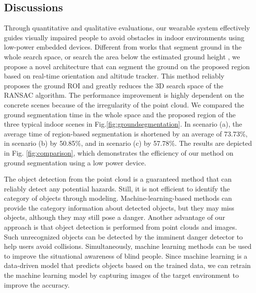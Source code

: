 \documentclass{ieeeaccess}
\begin{document}
\subsection{Discussions}
\begin{figure*}[t]
    \centering
    \caption{Comparison of time spent on ground segmentation among 100 epochs (including normal estimation). (a) Testing on the scenario Fig \ref{fig:groundsegmentation}(a). (b) Testing on the scenario Fig \ref{fig:groundsegmentation}(b). (c) Testing on the scenario Fig \ref{fig:groundsegmentation}(c).}%
    \label{fig:comparison}
\end{figure*}
Through quantitative and qualitative evaluations, our wearable system effectively guides visually impaired people to avoid obstacles in indoor environments using low-power embedded devices. 
Different from works \cite{takizawa2019kinect} \cite{yang2016expanding} that segment ground in the whole search space, or search the area below the estimated ground height \cite{bai2019wearable}, we propose a novel architecture that can segment the ground on the proposed region based on real-time orientation and altitude tracker. This method reliably proposes the ground ROI and greatly reduces the 3D search space of the RANSAC algorithm. The performance improvement is highly dependent on the concrete scenes because of the irregularity of the point cloud. We compared the ground segmentation time in the whole space and the proposed region of the three typical indoor scenes in Fig.\ref{fig:groundsegmentation}. In scenario (a), the average time of region-based segmentation is shortened by an average of 73.73\%, in scenario (b) by 50.85\%, and in scenario (c) by 57.78\%. The results are depicted in Fig. \ref{fig:comparison}, which demonstrates the efficiency of our method on ground segmentation using a low power device.

The object detection from the point cloud is a guaranteed method that can reliably detect any potential hazards. Still, it is not efficient to identify the category of objects through modeling. Machine-learning-based methods can provide the category information about detected objects, but they may miss objects, although they may still pose a danger. Another advantage of our approach is that object detection is performed from point clouds and images. Such unrecognized objects can be detected by the imminent  danger detector to help users avoid collisions. Simultaneously, machine learning methods can be used to improve the situational awareness of blind people. Since machine learning is 
a data-driven model that predicts objects based on the trained data, we can retrain the machine learning model by capturing images of the target environment to improve the accuracy. 
\end{document}
